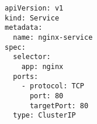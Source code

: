 \begin{verbatim}
apiVersion: v1
kind: Service
metadata:
  name: nginx-service
spec:
  selector:
    app: nginx
  ports:
    - protocol: TCP
      port: 80
      targetPort: 80
  type: ClusterIP
\end{verbatim}